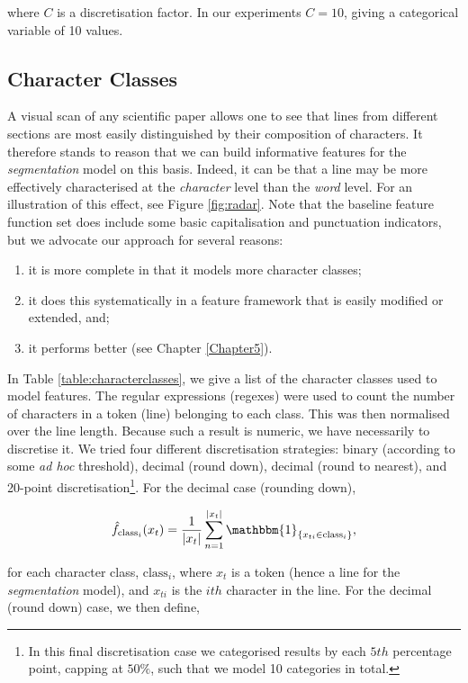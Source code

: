 where $C$ is a discretisation factor. In our experiments $C = 10$, giving a categorical variable of 10 values.

\subsection{Character Classes}
\label{subsec:characterclasses}
A visual scan of any scientific paper allows one to see that lines from different sections are most easily distinguished by their composition of characters. It therefore stands to reason that we can build informative features for the \emph{segmentation} model on this basis. Indeed, it can be that a line may be more effectively characterised at the \emph{character} level than the \emph{word} level. For an illustration of this effect, see Figure \ref{fig:radar}. Note that the baseline feature function set does include some basic capitalisation and punctuation indicators, but we advocate our approach for several reasons:

\begin{enumerate}
\item it is more complete in that it models more character classes;
\item it does this systematically in a feature framework that is easily modified or extended, and;
\item it performs better (see Chapter \ref{Chapter5}).
\end{enumerate}

In Table \ref{table:characterclasses}, we give a list of the character classes used to model features. The regular expressions (regexes) were used to count the number  of characters in a token (line) belonging to each class. This was then normalised over the line length. Because such a result is numeric, we have necessarily to discretise it. We tried four different discretisation strategies: binary (according to some \emph{ad hoc} threshold), decimal (round down), decimal (round to nearest), and 20-point discretisation\footnote{In this final discretisation case we categorised results by each $5th$ percentage point, capping at $50\%$, such that we model 10 categories in total.}. For the decimal case (rounding down),

\begin{equation}
\hat f_{\text{class}_i}(x_t) = \frac{1}{|x_t|}\sum_{n=1}^{|x_t|} \mathbbm{1}_{\{x_{ti} \in \text{class}_i\}},
\label{eq:classfunctions}
\end{equation}

for each character class, $\text{class}_i$, where $x_t$ is a token (hence a line for the \emph{segmentation} model), and $x_{ti}$ is the $ith$ character in the line. For the decimal (round down) case, we then define,

